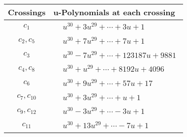 \documentclass[1p]{elsarticle_modified}
\theoremstyle{definition}
\begin{document}
\begin{tabular}{m{50pt}|m{274pt}}
Crossings & \hspace{64pt}u-Polynomials at each crossing \\
\hline $$\begin{aligned}c_{1}\end{aligned}$$&$\begin{aligned}
&u^{30}+3 u^{29}+\cdots+3 u+1
\end{aligned}$\\
\hline $$\begin{aligned}c_{2},c_{5}\end{aligned}$$&$\begin{aligned}
&u^{30}+7 u^{29}+\cdots+7 u+1
\end{aligned}$\\
\hline $$\begin{aligned}c_{3}\end{aligned}$$&$\begin{aligned}
&u^{30}-7 u^{29}+\cdots+123187 u+9881
\end{aligned}$\\
\hline $$\begin{aligned}c_{4},c_{8}\end{aligned}$$&$\begin{aligned}
&u^{30}+u^{29}+\cdots+8192 u+4096
\end{aligned}$\\
\hline $$\begin{aligned}c_{6}\end{aligned}$$&$\begin{aligned}
&u^{30}+9 u^{29}+\cdots+57 u+17
\end{aligned}$\\
\hline $$\begin{aligned}c_{7},c_{10}\end{aligned}$$&$\begin{aligned}
&u^{30}+3 u^{29}+\cdots+u+1
\end{aligned}$\\
\hline $$\begin{aligned}c_{9},c_{12}\end{aligned}$$&$\begin{aligned}
&u^{30}-3 u^{29}+\cdots-3 u+1
\end{aligned}$\\
\hline $$\begin{aligned}c_{11}\end{aligned}$$&$\begin{aligned}
&u^{30}+13 u^{29}+\cdots-7 u+1
\end{aligned}$\\
\hline
\end{tabular}\\~\\
\end{document}
